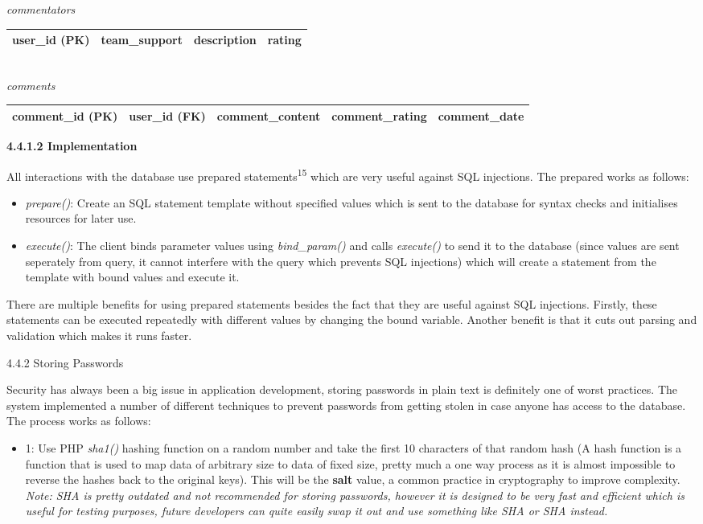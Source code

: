 \documentclass{article}
\begin{document}
\begin{flushleft}
\begin{tabular}{| c | c | c | c | c | c | c |}
\hline
\end{tabular}
\textit{commentators}\\
\begin{tabular}{| c | c | c | c |}
\hline
user\_id (PK) & team\_support & description & rating\\
\hline
\end{tabular}\\
\textit{comments}
\begin{tabular}{| c | c | c | c | c |}
\hline
comment\_id (PK) & user\_id (FK) & comment\_content & comment\_rating & comment\_date\\
\hline
\end{tabular}\par
\textbf {4.4.1.2 Implementation}\par
All interactions with the database use prepared statements\textsuperscript{15} which are very useful against SQL injections. The prepared works as follows:
\begin{itemize}
	\item \textit{prepare()}: Create an SQL statement template without specified values which is sent to the database for syntax checks and initialises resources for later use.
	\item \textit{execute()}: The client binds parameter values using \textit{bind\_param()} and calls \textit{execute()} to send it to the database (since values are sent seperately from query, it cannot interfere with the query which prevents SQL injections) which will create a statement from the template with bound values and execute it.
\end{itemize}
There are multiple benefits for using prepared statements besides the fact that they are useful against SQL injections. Firstly, these statements can be executed repeatedly with different values by changing the bound variable. Another benefit is that it cuts out parsing and validation which makes it runs faster.\par
{\large 4.4.2 Storing Passwords}\par
Security has always been a big issue in application development, storing passwords in plain text is definitely one of worst practices. The system implemented a number of different techniques to prevent passwords from getting stolen in case anyone has access to the database. The process works as follows:
\begin{itemize}
	\item 1: Use PHP \textit{sha1()} hashing function on a random number and take the first 10 characters of that random hash (A hash function is a function that is used to map data of arbitrary size to data of fixed size, pretty much a one way process as it is almost impossible to reverse the hashes back to the original keys). This will be the \textbf{salt} value, a common practice in cryptography to improve complexity. \textit{Note: SHA is pretty outdated and not recommended for storing passwords, however it is designed to be very fast and efficient which is useful for testing purposes, future developers can quite easily swap it out and use something like SHA or SHA instead.}

\end{itemize}
\end{flushleft}
\end{document}
